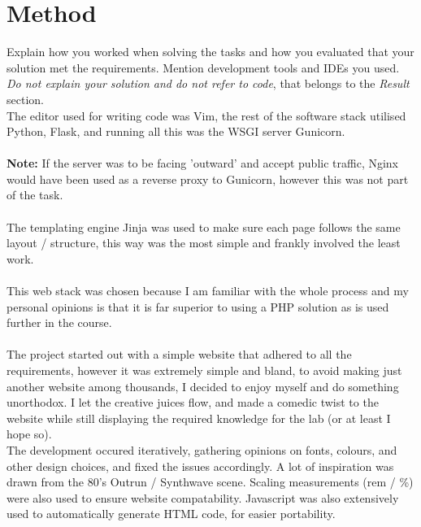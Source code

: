 \documentclass[a4paper]{scrartcl}
\begin{document}
\section{Method}

\noindent Explain how you worked when solving the tasks and how you evaluated that your solution met the requirements. Mention development tools and IDEs you used. \textit{Do not explain your solution and do not refer to code}, that belongs to the \textit{Result} section.
\\
The editor used for writing code was Vim, the rest of the software stack
utilised Python, Flask, and running all this was the WSGI server Gunicorn.\\\\
\textbf{Note:} If the server was to be facing 'outward' and accept public traffic, Nginx would
have been used as a reverse proxy to Gunicorn, however this was not part of the task.\\\\
The templating engine Jinja was used to 
make sure each page follows the same layout / structure,
this way was the most simple and frankly involved the least work.\\\\
This web stack was chosen because I am familiar with the whole process and my personal
opinions is that it is far superior to using a PHP solution as is used further in the course.\\\\
\noindent
The project started out with a simple website that adhered to all the requirements, however
it was extremely simple and bland, to avoid making just another website among thousands,
I decided to enjoy myself and do something unorthodox. I let the creative juices flow,
and made a comedic twist to the website while still displaying the required knowledge for
the lab (or at least I hope so).\\

\noindent
The development occured iteratively, gathering opinions on fonts, colours, and other
design choices, and fixed the issues accordingly. A lot of inspiration was drawn from
the 80's Outrun / Synthwave scene.
Scaling measurements (rem / \%) were also used to ensure website compatability.
Javascript was also extensively used to automatically generate HTML code, for easier portability.
\end{document}
